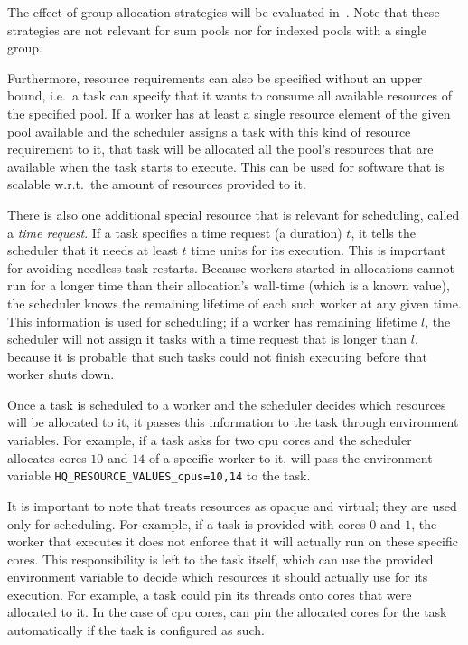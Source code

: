 The effect of group allocation strategies will be evaluated in~. Note that
these strategies are not relevant for sum pools nor for indexed pools with a single group.

Furthermore, resource requirements can also be specified without an upper bound, i.e.\ a task can
specify that it wants to consume all available resources of the specified pool. If a worker has at
least a single resource element of the given pool available and the scheduler assigns a task with
this kind of resource requirement to it, that task will be allocated all the pool's resources that
are available when the task starts to execute. This can be used for software that is scalable
w.r.t.\ the amount of resources provided to it.

There is also one additional special resource that is relevant for scheduling, called a
\emph{time request}. If a task specifies a time request (a duration) $t$, it
tells the scheduler that it needs at least $t$ time units for its execution.
This is important for avoiding needless task restarts. Because workers started in allocations
cannot run for a longer time than their allocation's wall-time (which is a known value), the
scheduler knows the remaining lifetime of each such worker at any given time. This information is
used for scheduling; if a worker has remaining lifetime $l$, the scheduler will
not assign it tasks with a time request that is longer than $l$, because it is
probable that such tasks could not finish executing before that worker shuts down.

Once a task is scheduled to a worker and the scheduler decides which resources will be allocated to
it, it passes this information to the task through environment variables. For example, if a task
asks for two \gls{cpu} cores and the scheduler allocates cores $10$
and $14$ of a specific worker to it, \hq{} will pass the
environment variable \texttt{HQ\_RESOURCE\_VALUES\_cpus=10,14} to the task.

It is important to note that \hyperqueue{} treats resources as opaque and virtual; they
are used only for scheduling. For example, if a task is provided with cores $0$
and $1$, the worker that executes it does not enforce that it will actually run
on these specific cores. This responsibility is left to the task itself, which can use the provided
environment variable to decide which resources it should actually use for its execution. For
example, a task could pin its threads onto cores that were allocated to it. In the case of
\gls{cpu} cores, \hq{} can pin the allocated cores for the task
automatically if the task is configured as such.

